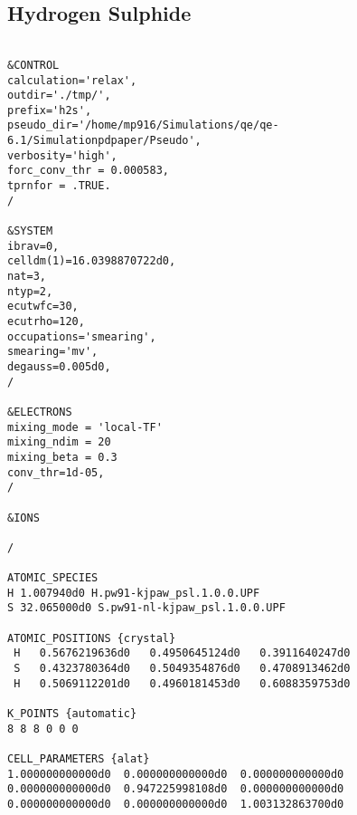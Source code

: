 \subsection{Hydrogen Sulphide}
\begin{verbatim}
    
&CONTROL
calculation='relax',
outdir='./tmp/',
prefix='h2s',
pseudo_dir='/home/mp916/Simulations/qe/qe-6.1/Simulationpdpaper/Pseudo',
verbosity='high',
forc_conv_thr = 0.000583,
tprnfor = .TRUE.
/

&SYSTEM
ibrav=0,
celldm(1)=16.0398870722d0,
nat=3,
ntyp=2,
ecutwfc=30,
ecutrho=120,
occupations='smearing',
smearing='mv',
degauss=0.005d0,
/

&ELECTRONS
mixing_mode = 'local-TF'
mixing_ndim = 20
mixing_beta = 0.3
conv_thr=1d-05,
/

&IONS

/

ATOMIC_SPECIES
H 1.007940d0 H.pw91-kjpaw_psl.1.0.0.UPF
S 32.065000d0 S.pw91-nl-kjpaw_psl.1.0.0.UPF

ATOMIC_POSITIONS {crystal}
 H   0.5676219636d0   0.4950645124d0   0.3911640247d0
 S   0.4323780364d0   0.5049354876d0   0.4708913462d0
 H   0.5069112201d0   0.4960181453d0   0.6088359753d0

K_POINTS {automatic}
8 8 8 0 0 0

CELL_PARAMETERS {alat}
1.000000000000d0  0.000000000000d0  0.000000000000d0
0.000000000000d0  0.947225998108d0  0.000000000000d0
0.000000000000d0  0.000000000000d0  1.003132863700d0


\end{verbatim}

